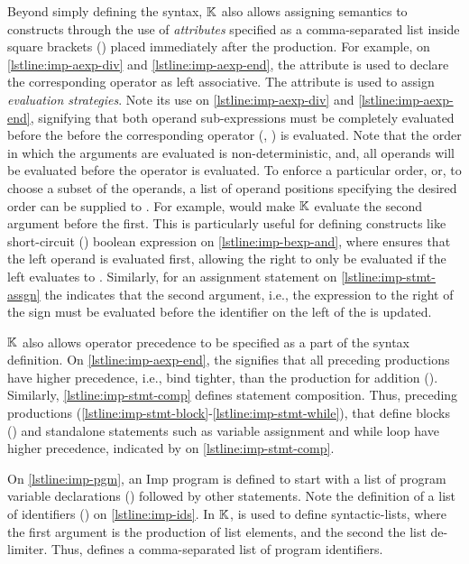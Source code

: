 Beyond simply defining the syntax, $\mathbb{K}{}$ also allows assigning semantics to
constructs through the use of \emph{attributes} specified as a comma-separated list
inside square brackets (\inlinek{[..]}) placed immediately after the \BNF{} production.
For example, on \autoref{lstline:imp-aexp-div} and \autoref{lstline:imp-aexp-end},
the attribute  is used to declare the
corresponding operator as left associative. The  attribute is used
to assign \emph{evaluation strategies}. Note its use
on \autoref{lstline:imp-aexp-div} and \autoref{lstline:imp-aexp-end}, signifying
that both operand sub-expressions must be completely evaluated before the
before the corresponding operator (\inlinek{/}, \inlinek{+}) is evaluated.
Note that the order in which the arguments are evaluated is non-deterministic,
and, all operands will be evaluated before the operator is evaluated.
To enforce a particular order, or, to choose a subset of the operands, a
list of operand positions specifying the desired order can be supplied to
. For example,  would make $\mathbb{K}$
evaluate the second argument before the first. This is particularly
useful for defining constructs like short-circuit (\inlineimp{&&}) boolean
expression on \autoref{lstline:imp-bexp-and}, where 
ensures that the left operand is evaluated first, allowing the right to only
be evaluated if the left evaluates to .
Similarly, for an assignment statement on \autoref{lstline:imp-stmt-assgn}
the  indicates that the second argument, i.e., the
expression to the right of the \inlineimp{=} sign must be evaluated before
the identifier on the left of the \inlineimp{=} is updated.

$\mathbb{K}{}$ also allows operator precedence to be specified as a part of the
syntax definition. On \autoref{lstline:imp-aexp-end},
the \inlinek{>} signifies that all preceding productions have higher precedence,
i.e., bind tighter, than the production for addition (\inlinek{+}).
Similarly, \autoref{lstline:imp-stmt-comp} defines statement composition.
Thus, preceding  productions
(\autoref{lstline:imp-stmt-block}-\autoref{lstline:imp-stmt-while}), that define
blocks () and standalone statements such as variable assignment and
while loop have higher precedence, indicated by \inlinek{>} on \autoref{lstline:imp-stmt-comp}.

On \autoref{lstline:imp-pgm}, an Imp program is defined to start with a list of program variable
declarations () followed by other statements. Note the
definition of a list of identifiers () on \autoref{lstline:imp-ids}. In $\mathbb{K}{}$,
 is used to define syntactic-lists, where the first
argument is the production of list elements, and the second the list de-limiter.
Thus,  defines a comma-separated list of program identifiers.

